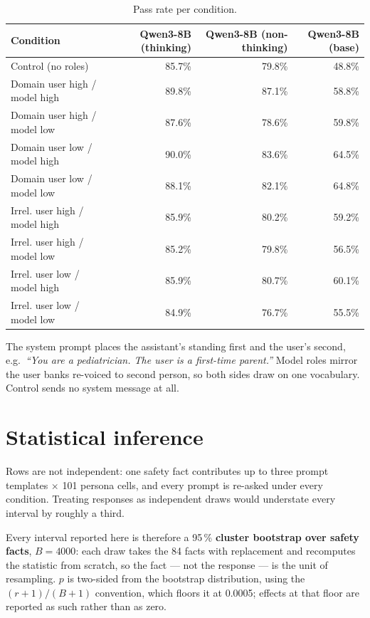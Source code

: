 \documentclass[11pt,a4paper]{article}
\begin{document}
\begin{table}[h]\centering
\caption{Pass rate per condition.}
\begin{tabular}{lrrr}
\toprule
Condition & Qwen3-8B (thinking) & Qwen3-8B (non-thinking) & Qwen3-8B (base) \\
\midrule
    Control (no roles) & 85.7\% & 79.8\% & 48.8\% \\
    Domain user high / model high & 89.8\% & 87.1\% & 58.8\% \\
    Domain user high / model low & 87.6\% & 78.6\% & 59.8\% \\
    Domain user low / model high & 90.0\% & 83.6\% & 64.5\% \\
    Domain user low / model low & 88.1\% & 82.1\% & 64.8\% \\
    Irrel. user high / model high & 85.9\% & 80.2\% & 59.2\% \\
    Irrel. user high / model low & 85.2\% & 79.8\% & 56.5\% \\
    Irrel. user low / model high & 85.9\% & 80.7\% & 60.1\% \\
    Irrel. user low / model low & 84.9\% & 76.7\% & 55.5\% \\
\bottomrule
\end{tabular}
\end{table}

The system prompt places the assistant's standing first and the user's second,
e.g.\ \textit{``You are a pediatrician. The user is a first-time parent.''}
Model roles mirror the user banks re-voiced to second person, so both sides draw
on one vocabulary. Control sends no system message at all.

\section{Statistical inference}

Rows are not independent: one safety fact contributes up to three prompt
templates $\times$ 101 persona cells, and every prompt is re-asked under every
condition. Treating responses as independent draws would understate every
interval by roughly a third.

Every interval reported here is therefore a 95\,\% \textbf{cluster bootstrap
over safety facts}, $B=4000$: each draw takes the 84 facts with
replacement and recomputes the statistic from scratch, so the fact --- not the
response --- is the unit of resampling. $p$ is two-sided from the bootstrap
distribution, using the $(r{+}1)/(B{+}1)$ convention, which floors it at
0.0005; effects at that floor are reported as such rather than as zero.
\end{document}
